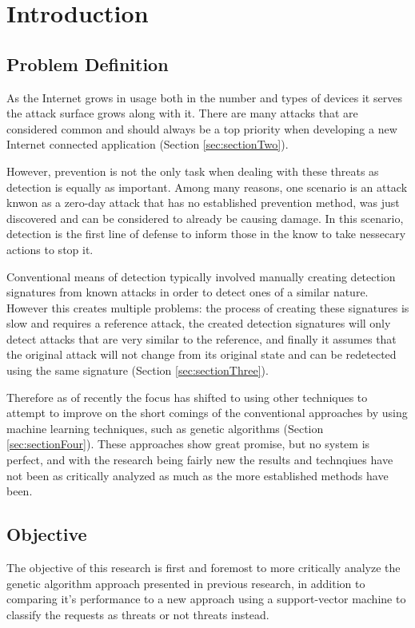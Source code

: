 \chapter{Introduction}
\section{Problem Definition}\label{sec:probDefinition}

As the Internet grows in usage both in the number and types of devices it serves the attack surface grows along with it.  There are many attacks that are considered common and should always be a top priority when developing a new Internet connected application (Section \ref{sec:sectionTwo}).

However, prevention is not the only task when dealing with these threats as detection is equally as important.  Among many reasons, one scenario is an attack knwon as a zero-day attack that has no established prevention method, was just discovered  and can be considered to already be causing damage.  In this scenario, detection is the first line of defense to inform those in the know to take nessecary actions to stop it.  

Conventional means of detection typically involved manually creating detection signatures from known attacks in order to detect ones of a similar nature.  However this creates multiple problems: the process of creating these signatures is slow and requires a reference attack, the created detection signatures will only detect attacks that are very similar to the reference, and finally it assumes that the original attack will not change from its original state and can be redetected using the same signature (Section \ref{sec:sectionThree}).

Therefore as of recently the focus has shifted to using other techniques to attempt to improve on the short comings of the conventional approaches by using machine learning techniques, such as genetic algorithms (Section \ref{sec:sectionFour}).  These approaches show great promise, but no system is perfect, and with the research being fairly new the results and technqiues have not been as critically analyzed as much as the more established methods have been.

\section{Objective}\label{sec:objectives}

The objective of this research is first and foremost to more critically analyze the genetic algorithm approach presented in previous research, in addition to comparing it's performance to a new approach using a support-vector machine to classify the requests as threats or not threats instead.

